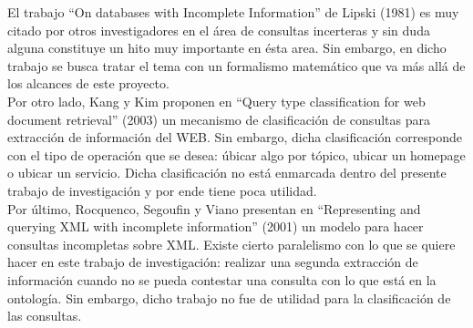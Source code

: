 El trabajo “On databases with Incomplete Information” de Lipski (1981)\cite{onDatabasesWithIncompleteInformation} es muy citado por otros investigadores en el área de consultas incerteras y sin duda alguna constituye un hito muy importante en ésta area. Sin embargo, en dicho trabajo se busca tratar el tema con un formalismo matemático que va más allá de los alcances de este proyecto. \\

Por otro lado, Kang y Kim proponen en  “Query type classification for web document retrieval” (2003)\cite{queryTypeClasWebDocumentRetrieval} un mecanismo de clasificación de consultas para extracción de información del WEB. Sin embargo, dicha clasificación corresponde con el tipo de operación que se desea: úbicar algo por tópico, ubicar un homepage o ubicar un servicio. Dicha clasificación no está enmarcada dentro del presente trabajo de investigación y por ende tiene poca utilidad. \\

Por último, Rocquenco, Segoufin y Viano presentan en “Representing and querying XML with incomplete information” (2001)\cite{repAndQueryXMLIncompInfo} un modelo para hacer consultas incompletas sobre XML. Existe cierto paralelismo con lo que se quiere hacer en este trabajo de investigación: realizar una segunda extracción de información cuando no se pueda contestar una consulta con lo que está en la ontología. Sin embargo, dicho trabajo no fue de utilidad para la clasificación de las consultas. \\